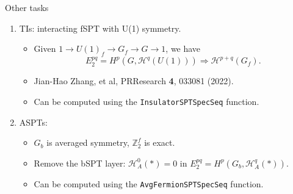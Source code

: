 \documentclass[xcolor=table, aspectratio=169]{beamer}
\begin{document}
\begin{frame}{Other tasks}
	\begin{enumerate}
		\item TIs: interacting fSPT with U(1) symmetry.
		\begin{itemize}
			\item Given $1\rightarrow U(1)_f\rightarrow G_f\rightarrow G\rightarrow 1$, we have
			\[E_2^{pq}=H^p(G, \mathcal H^q(U(1)))\Rightarrow \mathcal H^{p+q}(G_f).\]
			\item Jian-Hao Zhang, et al, PRResearch \textbf{4}, 033081 (2022).
			\item Can be computed using the \lstinline|InsulatorSPTSpecSeq| function.
		\end{itemize}

		\item ASPTs:
		\begin{itemize}
			\item $G_b$ is averaged symmetry, $\mathbb Z_2^f$ is exact.
			\item Remove the bSPT layer: $\mathcal H^0_A(*)=0$ in $E_2^{pq}=H^p(G_b, \mathcal H^q_A(*))$.
			\item Can be computed using the \lstinline|AvgFermionSPTSpecSeq| function.
		\end{itemize}
	\end{enumerate}
\end{frame}
\end{document}
